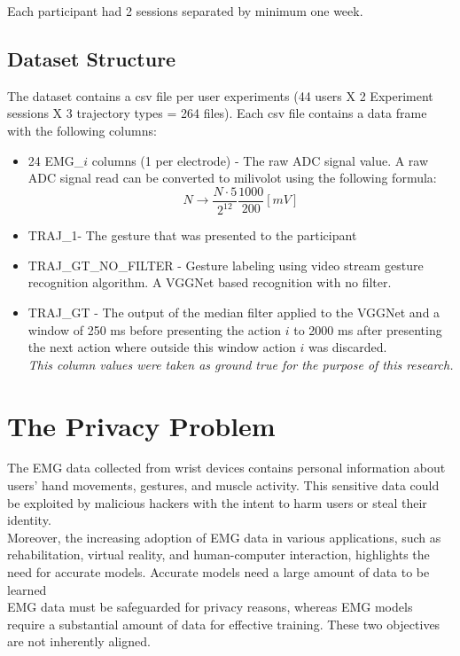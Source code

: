 \documentclass[fourier]{_style/dissertation}
\begin{document}
Each participant had 2 sessions separated by minimum one week.

\subsection{Dataset Structure}
The dataset contains a csv file per user experiments (44 users X 2 Experiment sessions X 3 trajectory types = 264 files).
Each csv file contains a data frame with the following columns:
\begin{itemize}
    \item 24 EMG\_$i$ columns (1 per electrode) - The raw ADC signal value. A raw ADC signal read can be converted to milivolot using the following formula:
    $$N \rightarrow \frac{N \cdot 5}{2^{12}}\frac{1000}{200}[mV]$$
    \item TRAJ\_1- The gesture that was presented to the participant
    \item TRAJ\_GT\_NO\_FILTER - Gesture labeling using video stream gesture recognition algorithm. A VGGNet based recognition with no filter.
    \item TRAJ\_GT - The output of the median filter applied to the VGGNet and a window of 250 ms before presenting the action $i$ to 2000 ms after presenting the next action where outside this window action $i$ was discarded. \\ \textit{This column values were taken as ground true for the purpose of this research.}
    
\end{itemize}

\section{The Privacy Problem}

The EMG data collected from wrist devices contains personal information about users' hand movements, gestures, and muscle activity. This sensitive data could be exploited by malicious hackers with the intent to harm users or steal their identity. \\

Moreover, the increasing adoption of EMG data in various applications, such as rehabilitation, virtual reality, and human-computer interaction, highlights the need for accurate models. Accurate models need a large amount of data to be learned \\

EMG data must be safeguarded for privacy reasons, whereas EMG models require a substantial amount of data for effective training. These two objectives are not inherently aligned. \\
\end{document}
